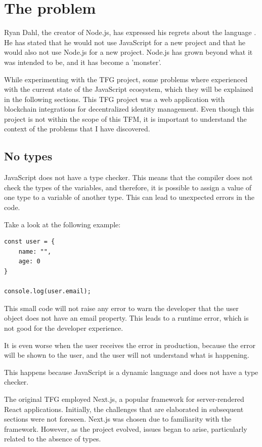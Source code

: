 \documentclass[10pt,journal,compsoc]{IEEEtran}
\begin{document}
\section{The problem}

Ryan Dahl, the creator of Node.js, has expressed his regrets about the language \cite{FKNODE}. He has stated that he would not use JavaScript for a new project and that he would also not use Node.js for a new project. Node.js has grown beyond what it was intended to be, and it has become a 'monster'.

While experimenting with the TFG \cite{TFG} project, some problems where experienced with the current state of the JavaScript ecosystem, which they will be explained in the following sections. This TFG project was a web application with blockchain integrations for decentralized identity management. Even though this project is not within the scope of this TFM, it is important to understand the context of the problems that I have discovered.

\subsection{No types}
JavaScript does not have a type checker. This means that the compiler does not check the types of the variables, and therefore, it is possible to assign a value of one type to a variable of another type. This can lead to unexpected errors in the code.

Take a look at the following example:
\begin{lstlisting}
const user = {
    name: "",
    age: 0
}
    
console.log(user.email);
    \end{lstlisting}

This small code will not raise any error to warn the developer that the user object does not have an email property. This leads to a runtime error, which is not good for the developer experience.

It is even worse when the user receives the error in production, because the error will be shown to the user, and the user will not understand what is happening.

This happens because JavaScript is a dynamic language and does not have a type checker.

The original TFG \cite{TFG} employed Next.js, a popular framework for server-rendered React applications. Initially, the challenges that are elaborated in subsequent sections were not foreseen. Next.js was chosen due to familiarity with the framework. However, as the project evolved, issues began to arise, particularly related to the absence of types.
\end{document}

